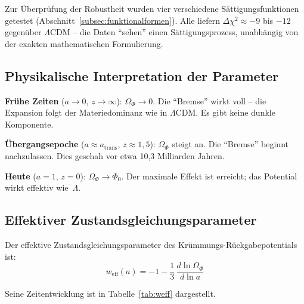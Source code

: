 \documentclass[aps,prd,twocolumn,superscriptaddress,nofootinbib]{revtex4-2}
\begin{document}
Zur \"Uberpr\"ufung der Robustheit wurden vier verschiedene S\"attigungsfunktionen getestet (Abschnitt~\ref{subsec:funktionalformen}). Alle liefern $\Delta\chi^2 \approx -9$ bis $-12$ gegen\"uber $\Lambda$CDM -- die Daten ``sehen'' einen S\"attigungsprozess, unabh\"angig von der exakten mathematischen Formulierung.

\subsection{Physikalische Interpretation der Parameter}
\label{subsec:interpretation}

\textbf{Fr\"uhe Zeiten} ($a \to 0$, $z \to \infty$): $\Omega_\Phi \to 0$. Die ``Bremse'' wirkt voll -- die Expansion folgt der Materiedominanz wie in $\Lambda$CDM. Es gibt keine dunkle Komponente.

\textbf{\"Ubergangsepoche} ($a \approx a_{\mathrm{trans}}$, $z \approx 1{,}5$): $\Omega_\Phi$ steigt an. Die ``Bremse'' beginnt nachzulassen. Dies geschah vor etwa 10,3 Milliarden Jahren.

\textbf{Heute} ($a = 1$, $z = 0$): $\Omega_\Phi \to \Phi_0$. Der maximale Effekt ist erreicht; das Potential wirkt effektiv wie~$\Lambda$.

\subsection{Effektiver Zustandsgleichungsparameter}
\label{subsec:weff}

Der effektive Zustandsgleichungsparameter des Kr\"ummungs-R\"uckgabepotentials ist:
\begin{equation}
w_{\mathrm{eff}}(a) = -1 - \frac{1}{3}\,\frac{d\ln\Omega_\Phi}{d\ln a}
\label{eq:weff}
\end{equation}

Seine Zeitentwicklung ist in Tabelle~\ref{tab:weff} dargestellt.
\end{document}

